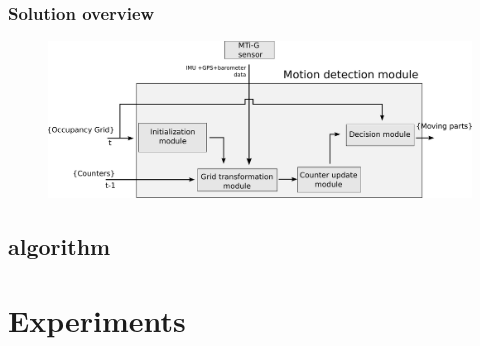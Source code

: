\documentclass{beamer}
\begin{document}
	\begin{frame}
		\frametitle{Solution overview}
		\begin{figure}[h]
			\center
			\includegraphics[scale=0.27]{../img/fig:motion:framework:motionmodule}
		 \end{figure}
		
	\end{frame}		
	

\subsection{algorithm}


\section{Experiments}
\end{document}
